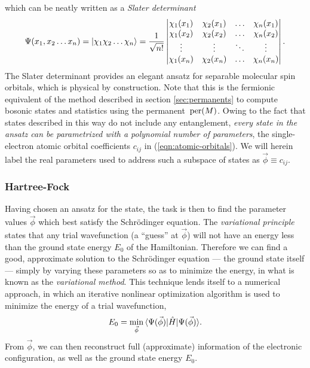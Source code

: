 which can be neatly written as a \emph{Slater determinant}
\begin{equation}
    \Psi(x_1, x_2 \ldots x_n) = 
    \mbox{$ | \chi_1 \chi_2 \ldots \chi_n \rangle $} =
    \frac{1}{\sqrt{n!}}
\begin{vmatrix}
    \chi_1(x_1) & \chi_2(x_1) & \ldots & \chi_n(x_1)  \\
    \chi_1(x_2) & \chi_2(x_2) & \ldots & \chi_n(x_2)  \\
    \vdots      & \vdots      & \ddots & \vdots       \\
    \chi_1(x_n) & \chi_2(x_n) & \ldots & \chi_n(x_n)
\end{vmatrix}.
\label{eqn:slater-determinant}
\end{equation}
The Slater determinant provides an elegant ansatz for separable molecular spin orbitals, which is physical by construction. Note that this is the fermionic equivalent of the method described in section \ref{sec:permanents} to compute bosonic states and statistics using the permanent $\,\mathrm{per}(M)$.
Owing to the fact that states described in this way do not include any entanglement, \emph{every state in the ansatz can be parametrized with a polynomial number of parameters}, the single-electron atomic orbital coefficients $c_{ij}$ in (\ref{eqn:atomic-orbitals}). We will herein label the real parameters used to address such a subspace of states as $\vec{\phi} \equiv c_{ij}$.

\subsubsection{Hartree-Fock}
\label{sec:hartree-fock}
Having chosen an ansatz for the state, the task is then to find the parameter values $\vec{\phi}$ which best satisfy the Schr\"odinger equation. The \emph{variational principle} states that any trial wavefunction (a ``guess'' at $\vec{\phi}$)  will not have an energy less than the ground state energy $E_0$ of the Hamiltonian. Therefore we can find a good, approximate solution to the Schr\"odinger equation --- the ground state itself --- simply by varying these parameters so as to minimize the energy, in what is known as the \emph{variational method}. This technique lends itself to a numerical approach, in which an iterative nonlinear optimization algorithm is used to minimize the energy of a trial wavefunction, 
\begin{equation}
    E_0 = \min_{\vec{\phi}} \mbox{$ \langle \Psi(\vec{\phi}) | $} \hat{H} \mbox{$ | \Psi(\vec{\phi}) \rangle $}.
    \label{eqn:variational-method}
\end{equation}
From $\vec{\phi}$, we can then reconstruct full (approximate) information of the electronic configuration, as well as the ground state energy $E_0$.

